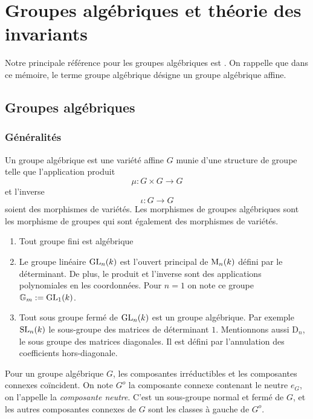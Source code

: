 \chapter{Groupes algébriques et théorie des invariants}

Notre principale référence pour les groupes algébriques est \cite{LAGSpringer}. On rappelle que dans ce mémoire, le terme groupe algébrique désigne un groupe algébrique affine.

\section{Groupes algébriques}

\subsection{Généralités}

\begin{defn}
Un groupe algébrique est une variété affine $G$ munie d'une structure de groupe telle que l'application produit
$$\mu:G\times G\rightarrow G$$
et l'inverse
$$\iota:G\rightarrow G$$
soient des morphismes de variétés. Les morphismes de groupes algébriques sont les morphisme de groupes  qui sont également des morphismes de variétés.
\end{defn}

\begin{ex}
\begin{enumerate}
\item Tout groupe fini est algébrique
\item Le groupe linéaire $\operatorname{GL}_n(k)$ est l'ouvert principal de $\operatorname{M}_n(k)$ défini par le déterminant. De plus, le produit et l'inverse sont des applications polynomiales en les coordonnées. Pour $n=1$ on note ce groupe $\mathbb{G}_m:=\operatorname{GL}_1(k)$.
\item Tout sous groupe fermé de $\operatorname{GL}_n(k)$ est un groupe algébrique. Par exemple $\operatorname{SL}_n(k)$ le sous-groupe des matrices de déterminant $1$. Mentionnons aussi D$_n$, le sous groupe des matrices diagonales. Il est défini par l'annulation des coefficients hors-diagonale.
\end{enumerate}
\end{ex}

Pour un groupe algébrique $G$, les composantes irréductibles et les composantes connexes coïncident. On note $G^o$ la composante connexe contenant le neutre $e_G$, on l'appelle la \textit{composante neutre}. C'est un sous-groupe normal et fermé de $G$, et les autres composantes connexes de $G$ sont les classes à gauche de $G^o$.

